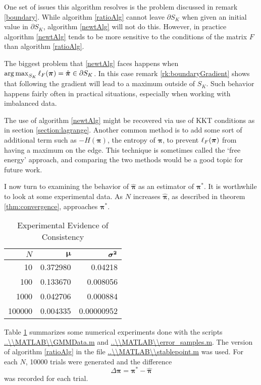 One set of issues this algorithm resolves is the problem discussed in remark \ref{boundary}.  While algorithm \ref{ratioAlg} cannot leave $\partial S_K$ when given an initial value in $\partial S_K$, algorithm \ref{newtAlg} will not do this.  However, in practice algorithm \ref{newtAlg} tends to be more sensitive to the conditions of the matrix $F$ than algorithm \ref{ratioAlg}. 

The biggest problem that \ref{newtAlg} faces happens when \( \operatorname*{arg\,max}_{S_K} \ell_{F}({\bm\pi}) = \hat{\bm\pi} \in \partial S_K\). In this case remark \ref{rk:boundaryGradient} shows that following the gradient will lead to a maximum outside of \( S_K \).  Such behavior happens fairly often in practical situations, especially when working with imbalanced data.  

The use of algorithm \ref{newtAlg} might be recovered via use of KKT conditions as in section \ref{section:lagrange}.  Another common method is to add some sort of additional term such as \( -H(\bm\pi) \), the entropy of  \( \bm\pi \), to prevent \( \ell_{F}({\bm\pi}) \) from having a maximum on the edge.  This technique is sometimes called the `free energy' approach, and comparing the two methods would be a good topic for future work.


I now turn to examining the behavior of $\hat{\bm\pi}$ as an estimator of $\bm\pi^\ast$. It is worthwhile to look at some experimental data. As $N$ increases $\hat{\bm\pi}$, as described in theorem \ref{thm:convergence}, approaches $\bm\pi^\ast$.

\begin{table}[h]
\centering
\begin{tabular}{r||r|r}
\toprule
\textbf{$N$} & \textbf{$\bm \mu$} & \textbf{$\bm{\sigma^2}$}\\
\midrule
10 & 0.372980 & 0.04218\\
100 & 0.133670 & 0.008056\\
1000 & 0.042706 & 0.000884 \\
100000 & 0.004335 & 0.00000952\\
\bottomrule
\end{tabular}
\caption{Experimental Evidence of Consistency}
\label{exprConsist}
\end{table}

Table \ref{exprConsist} summarizes some numerical experiments done with the scripts \url{..\\MATLAB\\GMMData.m} and \url{..\\MATLAB\\error_samples.m}. The version of  algorithm \ref{ratioAlg} in the file \url{..\\MATLAB\\stablepoint.m} was used. For each $N$, 10000 trials were generated and the difference 
\[\Delta\bm\pi=\bm\pi^\ast-\hat{\bm\pi}\]
was recorded for each trial.  

